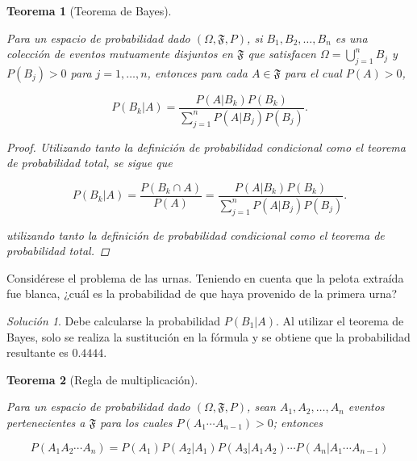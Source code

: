 \documentclass[
  us-letterpaper,
]{scrreprt}
\theoremstyle{plain}
\theoremstyle{definition}
\theoremstyle{definition}
\theoremstyle{plain}
\newtheorem{theorem}{Teorema}[chapter]
\theoremstyle{remark}
\newtheorem*{solution}{Solución}
\begin{document}
\begin{theorem}[Teorema de
Bayes]\protect\hypertarget{thm-bayes}{}\label{thm-bayes}

Para un espacio de probabilidad dado \((\Omega, \mathfrak{F}, P)\), si
\(B_1, B_2, \ldots, B_n\) es una colección de eventos mutuamente
disjuntos en \(\mathfrak{F}\) que satisfacen
\(\Omega=\bigcup\limits_{j=1}^n B_j\) y \(P(B_j)>0\) para
\(j=1,\ldots, n\), entonces para cada \(A\in\mathfrak{F}\) para el cual
\(P(A)>0\),

\[P(B_k|A)= \frac{P(A|B_k)P(B_k)}{\sum\limits_{j=1}^n P(A|B_j)P(B_j)}.\]

\begin{proof}
Utilizando tanto la definición de probabilidad condicional como el
teorema de probabilidad total, se sigue que

\[P(B_k|A)= \frac{P(B_k\cap A)}{P(A)}=\frac{P(A|B_k)P(B_k)}{\sum\limits_{j=1}^n P(A|B_j)P(B_j)}.\]

utilizando tanto la definición de probabilidad condicional como el
teorema de probabilidad total.
\end{proof}

\end{theorem}

\begin{tcolorbox}[enhanced jigsaw, bottomtitle=1mm, coltitle=black, breakable, leftrule=.75mm, left=2mm, rightrule=.15mm, titlerule=0mm, toprule=.15mm, toptitle=1mm, colback=white, colframe=quarto-callout-caution-color-frame, title={Ejemplo (\textbf{\emph{Seleccionar una pelota de varias urnas}})}, colbacktitle=quarto-callout-caution-color!10!white, arc=.35mm, bottomrule=.15mm, opacitybacktitle=0.6, opacityback=0]

Considérese el problema de las urnas. Teniendo en cuenta que la pelota
extraída fue blanca, ¿cuál es la probabilidad de que haya provenido de
la primera urna?

\begin{solution}
Debe calcularse la probabilidad \(P(B_1|A)\). Al utilizar el teorema de
Bayes, solo se realiza la sustitución en la fórmula y se obtiene que la
probabilidad resultante es \(0.4444\).
\end{solution}

\end{tcolorbox}

\begin{theorem}[Regla de
multiplicación]\protect\hypertarget{thm-mult}{}\label{thm-mult}

Para un espacio de probabilidad dado \((\Omega, \mathfrak{F}, P)\), sean
\(A_1, A_2, \ldots, A_n\) eventos pertenecientes a \(\mathfrak{F}\) para
los cuales \(P(A_1\cdots A_{n-1})>0\); entonces

\[P(A_1A_2\cdots A_n)= P(A_1)P(A_2|A_1)P(A_3|A_1A_2)\cdots P(A_n|A_1\cdots A_{n-1})\]

\end{theorem}
\end{document}
